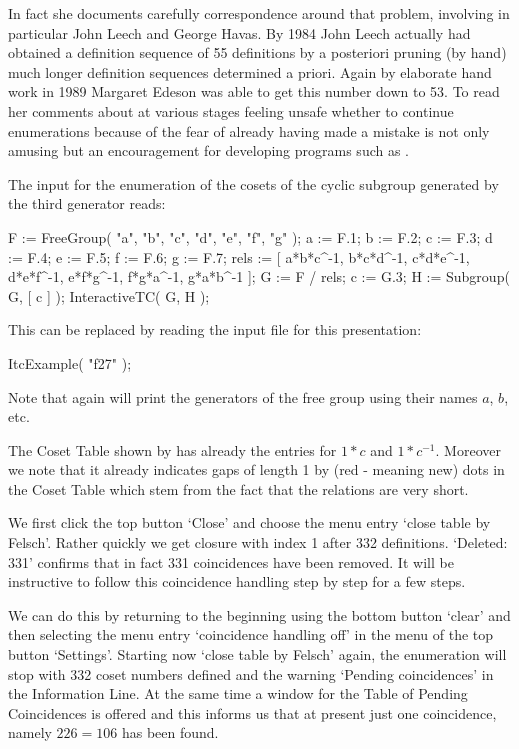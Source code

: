 In fact she documents carefully correspondence around that problem,
involving in particular John Leech and George Havas. By 1984 John
Leech actually had obtained a definition sequence of 55 definitions by
a posteriori pruning (by hand) much longer definition sequences
determined a priori. Again by elaborate hand work in 1989 Margaret
Edeson was able to get this number down to 53. To read her comments
about at various stages feeling unsafe whether to continue
enumerations because of the fear of already having made a mistake is
not only amusing but an encouragement for developing programs such as
{\ITC}.

The {\GAP} input for the enumeration of the cosets of the cyclic
subgroup generated by the third generator reads:

\begintt
F := FreeGroup( "a", "b", "c", "d", "e", "f", "g" );
a := F.1; b := F.2; c := F.3; d := F.4; e := F.5; f := F.6; g := F.7;
rels := [
  a*b*c^-1,
  b*c*d^-1,
  c*d*e^-1,
  d*e*f^-1,
  e*f*g^-1,
  f*g*a^-1,
  g*a*b^-1
];
G := F / rels;
c := G.3;
H := Subgroup( G, [ c ] );
InteractiveTC( G, H );
\endtt

This can be replaced by reading the input file for this presentation:

\begintt
ItcExample( "f27" );
\endtt

Note that again {\ITC} will print the generators of the free group
using their names $a$, $b$, etc.

The Coset Table shown by {\ITC} has already the entries for $1*c$ and
$1*c^{-1}$. Moreover we note that it already indicates gaps of length
1 by (red - meaning new) dots in the Coset Table which stem from the
fact that the relations are very short.

We first click the top button `Close' and choose the menu entry `close
table by Felsch'. Rather quickly we get closure with index 1 after
332 definitions. `Deleted: 331' confirms that in fact 331
coincidences have been removed. It will be instructive to follow this
coincidence handling step by step for a few steps.

We can do this by returning to the beginning using the bottom button
`clear' and then selecting the menu entry `coincidence handling off'
in the menu of the top button `Settings'. Starting now `close table
by Felsch' again, the enumeration will stop with 332 coset numbers
defined and the warning `Pending coincidences' in the Information
Line. At the same time a window for the Table of Pending Coincidences
is offered and this informs us that at present just one coincidence,
namely $226 = 106$ has been found.

